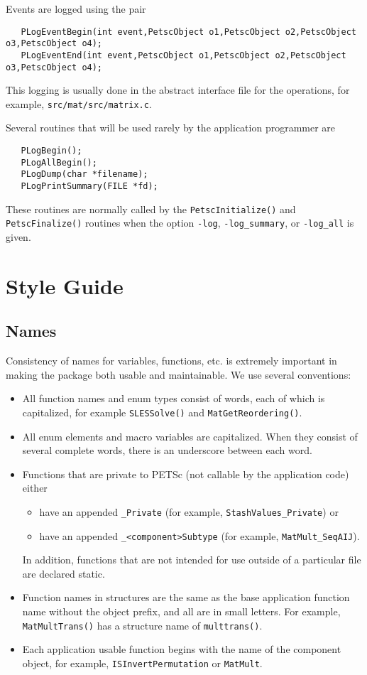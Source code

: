 Events are logged using the 
pair 
\begin{verbatim}
   PLogEventBegin(int event,PetscObject o1,PetscObject o2,PetscObject o3,PetscObject o4);
   PLogEventEnd(int event,PetscObject o1,PetscObject o2,PetscObject o3,PetscObject o4);
\end{verbatim}
This logging is usually done in the abstract
interface file for the operations, for example, {\tt src/mat/src/matrix.c}.

Several routines that will be used rarely by the 
application programmer 
are    
\begin{verbatim}
   PLogBegin();
   PLogAllBegin();
   PLogDump(char *filename);
   PLogPrintSummary(FILE *fd);
\end{verbatim}
These routines are normally called by the {\tt PetscInitialize()}
and {\tt PetscFinalize()} routines when the option {\tt -log}, 
{\tt -log\_summary}, or 
{\tt -log\_all} is given.

\chapter{Style Guide}

\section{Names}
Consistency of names for variables, functions, etc. is extremely 
important in making the package both usable and maintainable.
We use several conventions:
\begin{itemize}
\item All function names and enum types consist of words, each of 
      which is capitalized, for example {\tt SLESSolve()} and 
      {\tt MatGetReordering()}.
\item All enum elements and macro variables are capitalized. When
      they consist of several
      complete words, there is an underscore between each word.
\item Functions that are private to PETSc (not callable by the 
      application code) either
      \begin{itemize}
        \item have an appended {\tt \_Private} (for example, 
           {\tt StashValues\_Private}) or
        \item have an appended {\tt \_<component>Subtype} (for example,
           {\tt MatMult\_SeqAIJ}).
      \end{itemize}

      In addition, functions that are not intended for use outside
      of a particular file are declared static.
\item Function names in structures are the same as the base application
      function name without the object prefix, and all are in small letters. 
      For example, {\tt MatMultTrans()} has a structure name of 
      {\tt multtrans()}.
\item Each application usable function begins with the name of the component object, 
      for example, {\tt ISInvertPermutation} or {\tt MatMult}. 
\end{itemize}


